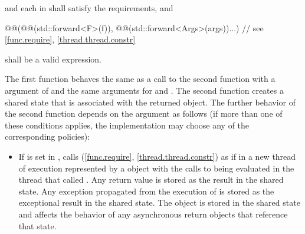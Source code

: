 \begin{itemdescr}
\pnum
\requires {} and each  in  shall
satisfy the
 requirements, and
\begin{codeblock}
@@(@@(std::forward<F>(f)),
       @@(std::forward<Args>(args))...)     // see \ref{func.require}, \ref{thread.thread.constr}
\end{codeblock}
shall be a valid expression.

\pnum
\effects
The first function
behaves the same as a call to the second function with a  argument of
and the same arguments for  and .
The second function creates a shared state that is associated with
the returned  object.
The further behavior
of the second function depends on the  argument as follows (if
more than one of these conditions applies, the implementation may choose any of
the corresponding policies):

\begin{itemize}
\item
If  is set in , calls
(\ref{func.require}, \ref{thread.thread.constr})
as if in a new thread of execution represented by a  object
with the calls to  being evaluated in the thread that called .
Any return value
is stored as the result in the
shared state. Any exception propagated from
the execution of
is stored as the exceptional result in the shared state.
The  object is
stored in the shared state
and affects the behavior of any asynchronous return objects that
reference that state.


\end{itemize}
\end{itemdescr}
